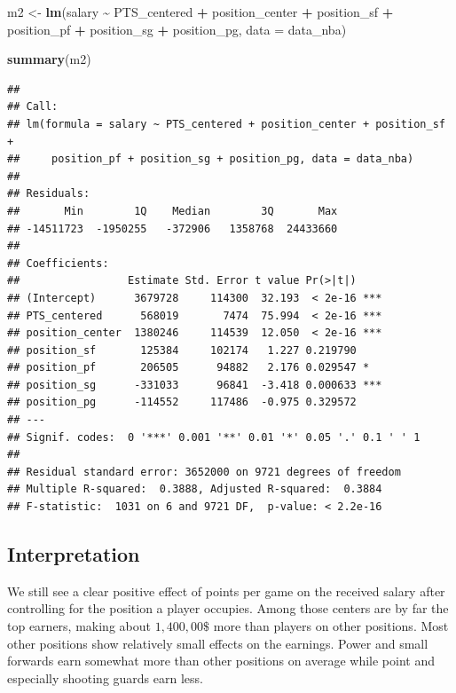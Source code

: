 \documentclass[
]{book}
\newenvironment{Shaded}{\begin{snugshade}}{\end{snugshade}}
\newcommand{\AttributeTok}[1]{\textcolor[rgb]{0.13,0.29,0.53}{#1}}
\newcommand{\FunctionTok}[1]{\textcolor[rgb]{0.13,0.29,0.53}{\textbf{#1}}}
\newcommand{\NormalTok}[1]{#1}
\newcommand{\OtherTok}[1]{\textcolor[rgb]{0.56,0.35,0.01}{#1}}
\newcommand{\SpecialCharTok}[1]{\textcolor[rgb]{0.81,0.36,0.00}{\textbf{#1}}}
\begin{document}
\begin{Shaded}
\begin{Highlighting}[]
\NormalTok{m2 }\OtherTok{\textless{}{-}} \FunctionTok{lm}\NormalTok{(salary }\SpecialCharTok{\textasciitilde{}}\NormalTok{ PTS\_centered }\SpecialCharTok{+}\NormalTok{ position\_center }\SpecialCharTok{+}\NormalTok{ position\_sf }\SpecialCharTok{+}\NormalTok{  position\_pf }\SpecialCharTok{+}\NormalTok{ position\_sg }\SpecialCharTok{+}\NormalTok{ position\_pg, }\AttributeTok{data =}\NormalTok{ data\_nba)}

\FunctionTok{summary}\NormalTok{(m2)}
\end{Highlighting}
\end{Shaded}

\begin{verbatim}
## 
## Call:
## lm(formula = salary ~ PTS_centered + position_center + position_sf + 
##     position_pf + position_sg + position_pg, data = data_nba)
## 
## Residuals:
##       Min        1Q    Median        3Q       Max 
## -14511723  -1950255   -372906   1358768  24433660 
## 
## Coefficients:
##                 Estimate Std. Error t value Pr(>|t|)    
## (Intercept)      3679728     114300  32.193  < 2e-16 ***
## PTS_centered      568019       7474  75.994  < 2e-16 ***
## position_center  1380246     114539  12.050  < 2e-16 ***
## position_sf       125384     102174   1.227 0.219790    
## position_pf       206505      94882   2.176 0.029547 *  
## position_sg      -331033      96841  -3.418 0.000633 ***
## position_pg      -114552     117486  -0.975 0.329572    
## ---
## Signif. codes:  0 '***' 0.001 '**' 0.01 '*' 0.05 '.' 0.1 ' ' 1
## 
## Residual standard error: 3652000 on 9721 degrees of freedom
## Multiple R-squared:  0.3888, Adjusted R-squared:  0.3884 
## F-statistic:  1031 on 6 and 9721 DF,  p-value: < 2.2e-16
\end{verbatim}

\hypertarget{interpretation-1}{%
\subsection{Interpretation}\label{interpretation-1}}

We still see a clear positive effect of points per game on the received
salary after controlling for the position a player occupies. Among those
centers are by far the top earners, making about \(1,400,00\$\) more than
players on other positions. Most other positions show relatively small
effects on the earnings. Power and small forwards earn somewhat more
than other positions on average while point and especially shooting
guards earn less.
\end{document}
